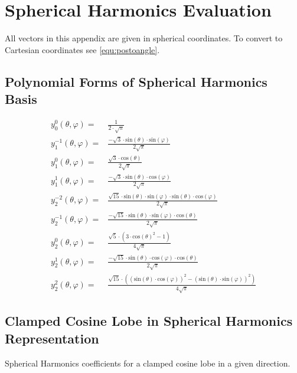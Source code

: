 \documentclass[thesis.tex]{subfiles}
\begin{document}
\appendix

\chapter{Spherical Harmonics Evaluation} 
All vectors in this appendix are given in spherical coordinates.
To convert to Cartesian coordinates see \autoref{equ:postoangle}.

\section{Polynomial Forms of Spherical Harmonics Basis}
\begin{align}
y^0_0(\theta, \varphi) =& \frac{1}{2\cdot \sqrt{\pi }} \\
y^{-1}_1(\theta, \varphi) =& \frac{-\sqrt{3}\cdot \mathrm{sin}\left( \theta\right) \cdot \mathrm{sin}\left( \varphi\right) }{2 \sqrt{\pi }} \\
y^0_1(\theta, \varphi) =& \frac{\sqrt{3}\cdot \mathrm{cos}\left( \theta\right) }{2 \sqrt{\pi }} \\
y^1_1(\theta, \varphi) =& \frac{-\sqrt{3}\cdot \mathrm{sin}\left( \theta\right) \cdot \mathrm{cos}\left( \varphi\right) }{2 \sqrt{\pi }} \\
y^{-2}_2(\theta, \varphi) =& \frac{\sqrt{15}\cdot \mathrm{sin}\left( \theta\right) \cdot \mathrm{sin}\left( \varphi\right) \cdot \mathrm{sin}\left( \theta\right) \cdot \mathrm{cos}\left( \varphi\right) }{2 \sqrt{\pi }} \\
y^{-1}_2(\theta, \varphi) =& \frac{-\sqrt{15}\cdot \mathrm{sin}\left( \theta\right) \cdot \mathrm{sin}\left( \varphi\right) \cdot \mathrm{cos}\left( \theta\right) }{2 \sqrt{\pi }} \\
y^0_2(\theta, \varphi) =& \frac{\sqrt{5}\cdot \left( 3\cdot {{\mathrm{cos}\left( \theta\right) }^{2}}-1\right) }{4 \sqrt{\pi }} \\
y^{1}_2(\theta, \varphi) =& \frac{-\sqrt{15}\cdot \mathrm{sin}\left( \theta\right) \cdot \mathrm{cos}\left( \varphi\right) \cdot \mathrm{cos}\left( \theta\right) }{2 \sqrt{\pi }} \\
y^{2}_2(\theta, \varphi) =& \frac{\sqrt{15}\cdot \left( {{\left( \mathrm{sin}\left( \theta\right) \cdot \mathrm{cos}\left( \varphi\right) \right) }^{2}}-{{\left( \mathrm{sin}\left( \theta\right) \cdot \mathrm{sin}\left( \varphi\right) \right) }^{2}}\right) }{4 \sqrt{\pi }}
\end{align}

\newpage

\section{Clamped Cosine Lobe in Spherical Harmonics Representation} \label{chap:shcosinelobe}
Spherical Harmonics coefficients for a clamped cosine lobe in a given direction.
\end{document}
